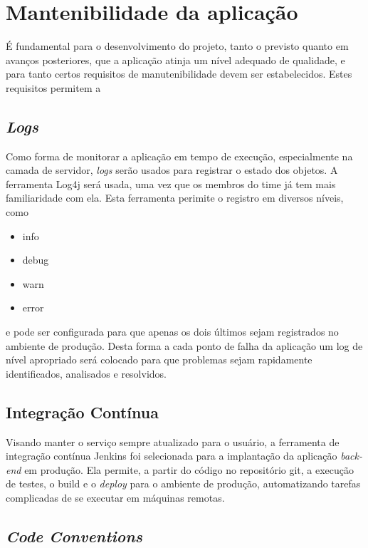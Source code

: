 \section{Mantenibilidade da aplicação}

É fundamental para o desenvolvimento do projeto, tanto o previsto
quanto em avanços posteriores, que a aplicação atinja um nível adequado
de qualidade, e para tanto certos requisitos de manutenibilidade devem
ser estabelecidos.  Estes requisitos permitem a

\subsection{\emph{Logs}}

Como forma de monitorar a aplicação em tempo de execução,
especialmente na camada de servidor, \emph{logs} serão usados para
registrar o estado dos objetos. A ferramenta Log4j será usada, uma vez
que os membros do time já tem mais familiaridade com ela. Esta
ferramenta perimite o registro em diversos níveis, como
\begin{itemize}
  \em
\item info
\item debug
\item warn
\item error
\end{itemize}
e pode ser configurada para que apenas os dois últimos
sejam registrados no ambiente de produção. Desta forma a cada ponto de
falha da aplicação um log de nível apropriado será colocado para que
problemas sejam rapidamente identificados, analisados e resolvidos.

\subsection{Integração Contínua}

Visando manter o serviço sempre atualizado para o usuário, a
ferramenta de integração contínua Jenkins foi selecionada para a
implantação da aplicação \emph{back-end} em produção. Ela
permite, a partir do código no repositório git, a execução de testes,
o build e o \emph{deploy} para o ambiente de produção, automatizando tarefas
complicadas de se executar em máquinas remotas.


\subsection{\emph{Code Conventions}}

